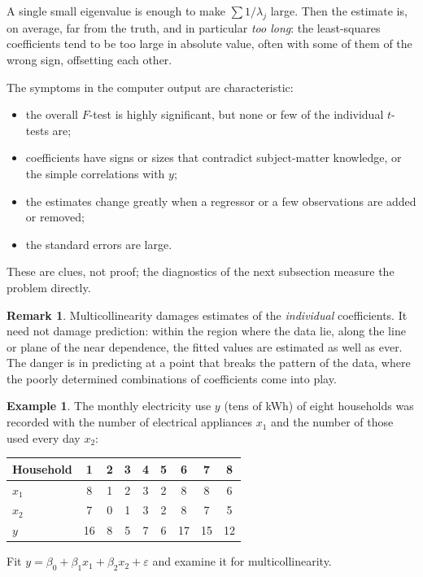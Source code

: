 \documentclass[11pt,a4paper]{article}
\numberwithin{equation}{section}
\theoremstyle{definition}
\newtheorem{exa}[thm]{Example}
\newtheorem*{remark}{Remark}
\begin{document}
A single small eigenvalue is enough to make $\sum 1/\lambda_j$ large. Then the estimate is, on average,
far from the truth, and in particular \emph{too long}: the least-squares coefficients tend to be too
large in absolute value, often with some of them of the wrong sign, offsetting each other.

The symptoms in the computer output are characteristic:
\begin{itemize}
\item the overall $F$-test is highly significant, but none or few of the individual $t$-tests are;
\item coefficients have signs or sizes that contradict subject-matter knowledge, or the simple
correlations with $y$;
\item the estimates change greatly when a regressor or a few observations are added or removed;
\item the standard errors are large.
\end{itemize}
These are clues, not proof; the diagnostics of the next subsection measure the problem directly.

\begin{remark}
Multicollinearity damages estimates of the \emph{individual} coefficients. It need not damage
prediction: within the region where the data lie, along the line or plane of the near dependence,
the fitted values are estimated as well as ever. The danger is in predicting at a point that breaks
the pattern of the data, where the poorly determined combinations of coefficients come into play.
\end{remark}

\begin{exa}\label{exa:appliances}
The monthly electricity use $y$ (tens of kWh) of eight households was recorded with the number of
electrical appliances $x_1$ and the number of those used every day $x_2$:
\begin{center}
\begin{tabular}{l|cccccccc}
Household & 1 & 2 & 3 & 4 & 5 & 6 & 7 & 8 \\
\hline
$x_1$ & 8 & 1 & 2 & 3 & 2 & 8 & 8 & 6 \\
$x_2$ & 7 & 0 & 1 & 3 & 2 & 8 & 7 & 5 \\
$y$ & 16 & 8 & 5 & 7 & 6 & 17 & 15 & 12 \\
\end{tabular}
\end{center}
Fit $y = \beta_0 + \beta_1x_1 + \beta_2x_2 + \varepsilon$ and examine it for multicollinearity.
\end{exa}
\end{document}
